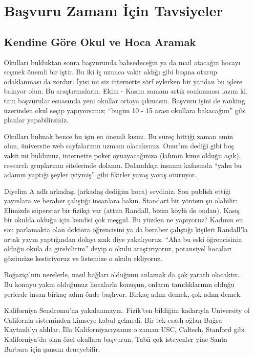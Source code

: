 \documentclass[12pt]{article}
\begin{document}
\newpage
%
%
\section{Başvuru Zamanı İçin Tavsiyeler}
%
\subsection{Kendine Göre Okul ve Hoca Aramak}
Okulları bulduktan sonra başvurunda bahsedeceğin ya da mail atacağın hocayı seçmek önemli bir iştir. Bu iki iş uzunca vakit aldığı gibi başına oturup odaklanması da zordur. İyisi mi siz internette sörf eylerken bir yandan bu işlere bakıyor olun. Bu araştırmaların, Ekim - Kasım zamanı artık sonlanması lazım ki, tam başvurular esnasında yeni okullar ortaya çıkmasın. Başvuru işini de ranking üzerinden okul seçip yapıyorsanız; “bugün 10 - 15 arası okullara bakacağım” gibi planlar yapabilirsiniz.

Okulları bulmak bence bu işin en önemli kısmı. Bu süreç bittiği zaman emin olun, üniversite web sayfalarının uzmanı olacaksınız. Onur’un dediği gibi boş vakit mi buldunuz, internette poker oynayacağınıza (lafımın kime olduğu açık), research gruplarının sitelerinde dolanın. Dolandıkça insanın kafasında “yahu bu adamın yaptığı şeyler iyiymiş” gibi fikirler yavaş yavaş oturuyor.

Diyelim A adlı arkadaşı (arkadaş dediğim hoca) sevdiniz. Son publish ettiği yayınlara ve beraber çalıştığı insanlara bakın. Standart bir yöntem şu olabilir: Elimizde süperstar bir fizikçi var (attım Randall, bizim köylü de ondan). Kasış bir okulda olduğu için kendisi çok meşgul. Bu yüzden ne yapıyoruz? Kadının en son parlamakta olan doktora öğrencisini ya da beraber çalıştığı kişileri Randall’la ortak yayın yaptığından dolayı zınk diye yakalıyoruz. “Aha bu eski öğrencisinin olduğu okula da girebilirim” deyip o okulu araştırıyoruz, potansiyel hocaları gözümüze kestiriyoruz ve listemize o okulu ekliyoruz. 

Boğaziçi’nin nerelerle, nasıl bağları olduğunu anlamak da çok yararlı olacaktır. Bu konuyu yakın olduğunuz hocalarla konuşun, onların tanıdıklarının olduğu yerlerde insan birkaç adım önde başlıyor. Birkaç adım demek, çok adım demek. 

Kaliforniya Sendromu’na yakalanmayın. Fizik’ten bildiğim kadarıyla University of California sisteminden kimseye kabul gelmedi. Bir tek esaslı oğlan Buğra Kaytanlı’yı aldılar. İlla Kaliforniyacıysanız o zaman USC, Caltech, Stanford gibi Kaliforniya’da olan özel okullara başvurun. Tabii çok isteyenler yine Santa Barbara için şansını deneyebilir.
\end{document}
